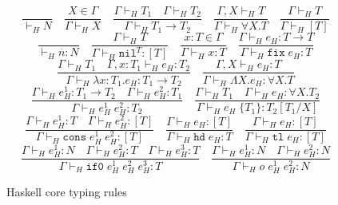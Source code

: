 \begin{figure}
\label{hctr}
\caption{Haskell core typing rules}
\[
\frac{}{\vdash_{H}N}
\quad
\frac{X\in\Gamma}{\Gamma\vdash_{H}X}
\quad
\frac{\Gamma\vdash_{H}T_{1}\quad\Gamma\vdash_{H}T_{2}}{\Gamma\vdash_{H}T_{1}\rightarrow T_{2}}
\quad
\frac{\Gamma ,X\vdash_{H}T}{\Gamma\vdash_{H}\forall X.T}
\quad
\frac{\Gamma\vdash_{H}T}{\Gamma\vdash_{H}[T]}
\]
\bigskip
\[
\frac{}{\vdash_{H}\overline{n}:N}
\quad
\frac{\Gamma\vdash_{H}T}{\Gamma\vdash_{H}\mathtt{nil}^{T}:[T]}
\quad
\frac{x:T\in\Gamma}{\Gamma\vdash_{H}x:T}
\quad
\frac{\Gamma\vdash_{H}e_{H}:T\rightarrow T}{\Gamma\vdash_{H}\mathtt{fix}\;e_{H}:T}
\]
\[
\frac{\Gamma\vdash_{H}T_{1}\quad\Gamma,x:T_{1}\vdash_{H}e_{H}:T_{2}}{\Gamma\vdash_{H}\lambda x:T_{1}.e_{H}:T_{1}\rightarrow T_{2}}
\quad
\frac{\Gamma,X\vdash_{H}e_{H}:T}{\Gamma\vdash_{H}\Lambda X.e_{H}:\forall X.T}
\]
\[
\frac{\Gamma\vdash_{H}e_{H}^{1}:T_{1}\rightarrow T_{2}\quad\Gamma\vdash_{H}e_{H}^{2}:T_{1}}{\Gamma\vdash_{H}e_{H}^{1}\;e_{H}^{2}:T_{2}}
\quad
\frac{\Gamma\vdash_{H}T_{1}\quad\Gamma\vdash_{H}e_{H}:\forall X.T_{2}}{\Gamma\vdash_{H}e_{H}\;\lbrace T_{1}\rbrace:T_{2}[T_{1}/X]}
\]
\[
\frac{\Gamma\vdash_{H}e_{H}^{1}:T\quad\Gamma\vdash_{H}e_{H}^{2}:[T]}{\Gamma\vdash_{H}\mathtt{cons}\;e_{H}^{1}\;e_{H}^{2}:[T]}
\quad
\frac{\Gamma\vdash_{H}e_{H}:[T]}{\Gamma\vdash_{H}\mathtt{hd}\;e_{H}:T}
\quad
\frac{\Gamma\vdash_{H}e_{H}:[T]}{\Gamma\vdash_{H}\mathtt{tl}\;e_{H}:[T]}
\]
\[
\frac{\Gamma\vdash_{H}e_{H}^{1}:N\quad\Gamma\vdash_{H}e_{H}^{2}:T\quad\Gamma\vdash_{H}e_{H}^{3}:T}{\Gamma\vdash_{H}\mathtt{if0}\;e_{H}^{1}\;e_{H}^{2}\;e_{H}^{3}:T}
\quad
\frac{\Gamma\vdash_{H}e_{H}^{1}:N\quad\Gamma\vdash_{H}e_{H}^{2}:N}{\Gamma\vdash_{H}o\;e_{H}^{1}\;e_{H}^{2}:N}
\]
\end{figure}